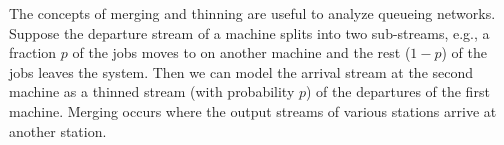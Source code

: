 The concepts of merging and thinning are  useful to analyze queueing
  networks. Suppose the departure stream of a machine splits into
  two sub-streams, e.g., a fraction $p$ of the jobs moves to on another
  machine and the rest ($1-p$) of the jobs leaves the system. Then we
  can model the arrival stream at the second machine as a thinned
  stream (with probability $p$) of the departures of the first
  machine. Merging occurs where the output streams of various stations arrive at another station. 





